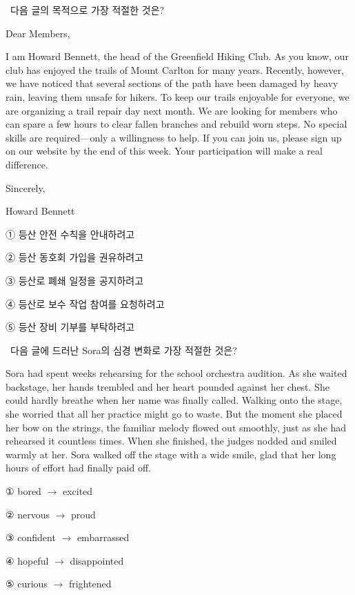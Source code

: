 \documentclass[10pt,a4paper,twocolumn]{article}
\newcommand{\probno}[1]{\noindent{\fontsize{12}{14}\selectfont\bfseries #1.}\ }
\newcommand{\instr}[1]{{\sffamily #1}\par\vspace{2pt}}
\begin{document}
\probno{18}\instr{다음 글의 목적으로 가장 적절한 것은?}
\begin{pbox}
Dear Members,\par
\hspace{1em}I am Howard Bennett, the head of the Greenfield Hiking Club. As you know, our club has enjoyed the trails of Mount Carlton for many years. Recently, however, we have noticed that several sections of the path have been damaged by heavy rain, leaving them unsafe for hikers. To keep our trails enjoyable for everyone, we are organizing a trail repair day next month. We are looking for members who can spare a few hours to clear fallen branches and rebuild worn steps. No special skills are required—only a willingness to help. If you can join us, please sign up on our website by the end of this week. Your participation will make a real difference.\par
Sincerely,\par
Howard Bennett
\end{pbox}
\begin{choices}
\item ① 등산 안전 수칙을 안내하려고
\item ② 등산 동호회 가입을 권유하려고
\item ③ 등산로 폐쇄 일정을 공지하려고
\item ④ 등산로 보수 작업 참여를 요청하려고
\item ⑤ 등산 장비 기부를 부탁하려고
\end{choices}
\vspace{6pt}

\probno{19}\instr{다음 글에 드러난 Sora의 심경 변화로 가장 적절한 것은?}
\par\noindent Sora had spent weeks rehearsing for the school orchestra audition. As she waited backstage, her hands trembled and her heart pounded against her chest. She could hardly breathe when her name was finally called. Walking onto the stage, she worried that all her practice might go to waste. But the moment she placed her bow on the strings, the familiar melody flowed out smoothly, just as she had rehearsed it countless times. When she finished, the judges nodded and smiled warmly at her. Sora walked off the stage with a wide smile, glad that her long hours of effort had finally paid off.
\begin{choices}
\item ① bored $\rightarrow$ excited
\item ② nervous $\rightarrow$ proud
\item ③ confident $\rightarrow$ embarrassed
\item ④ hopeful $\rightarrow$ disappointed
\item ⑤ curious $\rightarrow$ frightened
\end{choices}
\vspace{6pt}
\end{document}
